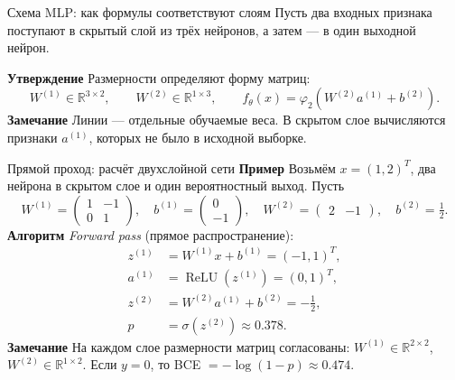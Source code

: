 \documentclass[10pt]{beamer}
\newcommand{\mlBody}{\normalsize}
\newcommand{\mlStatement}{\textcolor{defblue}{\bfseries Утверждение}}
\newcommand{\mlRemark}{\textcolor{defblue}{\bfseries Замечание}}
\newcommand{\mlExample}{\textcolor{defblue}{\bfseries Пример}}
\newcommand{\mlAlgorithm}{\textcolor{defblue}{\bfseries Алгоритм}}
\begin{document}
\begin{frame}{Схема MLP: как формулы соответствуют слоям}
\mlBody
Пусть два входных признака поступают в скрытый слой из трёх нейронов, а затем --- в один выходной нейрон.
\vspace{0.1cm}
\begin{center}
\end{center}
\mlStatement\; Размерности определяют форму матриц:
\[
W^{(1)}\in\mathbb R^{3\times2},\qquad
W^{(2)}\in\mathbb R^{1\times3},\qquad
f_\theta(x)=\varphi_2\!\left(W^{(2)}a^{(1)}+b^{(2)}\right).
\]
\mlRemark\; Линии --- отдельные обучаемые веса. В скрытом слое вычисляются признаки $a^{(1)}$, которых не было в исходной выборке.
\end{frame}


\begin{frame}{Прямой проход: расчёт двухслойной сети}
\mlBody
\mlExample\; Возьмём $x=(1,2)^T$, два нейрона в скрытом слое
и один вероятностный выход. Пусть
\[
W^{(1)}=\begin{pmatrix}1&-1\\0&1\end{pmatrix},\quad
b^{(1)}=\begin{pmatrix}0\\-1\end{pmatrix},\quad
W^{(2)}=\begin{pmatrix}2&-1\end{pmatrix},\quad b^{(2)}=\tfrac12.
\]
\mlAlgorithm\; \textit{Forward pass} (прямое распространение):
\[
\begin{aligned}
 z^{(1)}&=W^{(1)}x+b^{(1)}=(-1,1)^T,\\
 a^{(1)}&=\operatorname{ReLU}(z^{(1)})=(0,1)^T,\\
 z^{(2)}&=W^{(2)}a^{(1)}+b^{(2)}=-\tfrac12,\\
 p&=\sigma(z^{(2)})\approx0.378.
\end{aligned}
\]
\mlRemark\; На каждом слое размерности матриц согласованы:
$W^{(1)}\in\mathbb R^{2\times2}$,
$W^{(2)}\in\mathbb R^{1\times2}$.
Если $y=0$, то BCE $=-\log(1-p)\approx0.474$.
\end{frame}
\end{document}
